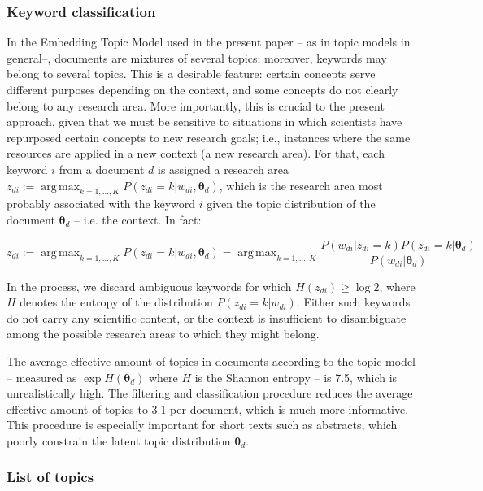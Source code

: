 \documentclass{article}
\DeclareMathOperator*{\argmax}{arg\,max}
\begin{document}
\subsubsection{\label{appendix:keywords}Keyword classification}

In the Embedding Topic Model used in the present paper -- as in topic models in general--, documents are mixtures of several topics; moreover, keywords may belong to several topics. This is a desirable feature: certain concepts serve different purposes depending on the context, and some concepts do not clearly belong to any research area. More importantly, this is crucial to the present approach, given that we must be sensitive to situations in which scientists have repurposed certain concepts to new research goals; i.e., instances where the same resources are applied in a new context (a new research area).
For that, each keyword $i$ from a document $d$ is assigned a research area $z_{di} := \argmax_{k=1,\dots,K} P(z_{di}=k|w_{di},\bm{\theta}_{d})$, which is the research area most probably associated with the keyword $i$ given the topic distribution of the document $\bm{\theta}_d$ -- i.e. the context. In fact:

\begin{equation}
    z_{di} := \argmax_{k=1,\dots,K} P(z_{di}=k|w_{di},\bm{\theta}_{d}) =  \argmax_{k=1,\dots,K} \dfrac{P(w_{di}|z_{di}=k)P(z_{di}=k|\bm{\theta}_d)}{P(w_{di}|\bm{\theta}_d)}
\end{equation}

In the process, we discard ambiguous keywords for which $H(z_{di})\geq \log{2}$, where $H$ denotes the entropy of the distribution $P(z_{di}=k|w_{di})$. Either such keywords do not carry any scientific content, or the context is insufficient to disambiguate among the possible research areas to which they might belong.

The average effective amount of topics in documents according to the topic model -- measured as $\exp H(\bm{\theta}_{d})$ where $H$ is the Shannon entropy -- is 7.5, which is unrealistically high. The filtering and classification procedure reduces the average effective amount of topics to 3.1 per document, which is much more informative. This procedure is especially important for short texts such as abstracts, which poorly constrain the latent topic distribution $\bm{\theta}_{d}$.

\subsubsection{List of topics}
\end{document}
